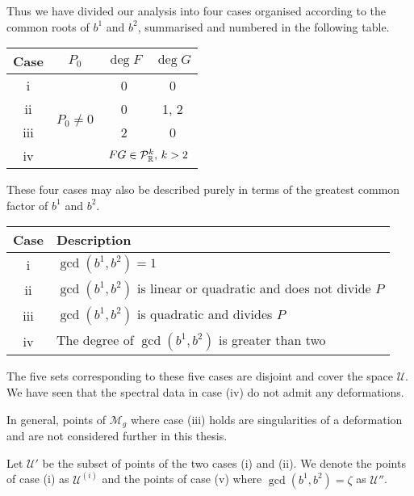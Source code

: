 \documentclass{article}
\begin{document}
Thus we have divided our analysis into four cases organised according to the common roots of $b^1$ and $b^2$, summarised and numbered in the following table.
\begin{center}
\begin{tabular}{|c|c|c|c|}
\hline
Case & $P_0$ & $\deg F$ & $\deg G$ \\ \hline\hline
i & \multirow{4}{*}{$P_0 \neq 0$} & 0 & 0 \\ \cline{1-1}\cline{3-4}
ii && 0 & 1, 2 \\ \cline{1-1}\cline{3-4}
iii && 2 & 0 \\ \cline{1-1}\cline{3-4}
iv && \multicolumn{2}{|c|}{$FG \in \mathcal{P}^k_{\mathbb{R}},\, k>2$} \\ \hline
\end{tabular}
\end{center}
These four cases may also be described purely in terms of the greatest common factor of $b^1$ and $b^2$.
\begin{center}
\begin{tabular}{|c|l|}
\hline
Case & Description\\ \hline\hline
i & $\gcd(b^1,b^2) = 1$\\ \hline
ii & $\gcd(b^1,b^2)$ is linear or quadratic and does not divide $P$ \\ \hline
iii & $\gcd(b^1,b^2)$ is quadratic and divides $P$ \\ \hline
iv & The degree of $\gcd(b^1,b^2)$ is greater than two \\ \hline
\end{tabular}
\end{center}

The five sets corresponding to these five cases are disjoint and cover the space $\mathcal{U}$. We have seen that the spectral data in case (iv) do not admit any deformations.

In general, points of $\mathcal{M}_g$ where case (iii) holds are singularities of a deformation \cite{Schmidt2016} and are not considered further in this thesis.
\begin{defn}
\label{def:subsets U}
Let $\mathcal{U}'$ be the subset of points of the two cases (i) and (ii).
We denote the points of case (i) as $\mathcal{U}^{(i)}$ and the points of case (v) where $\gcd(b^1,b^2) = \zeta$ as $\mathcal{U}''$.
\end{defn}
\end{document}
